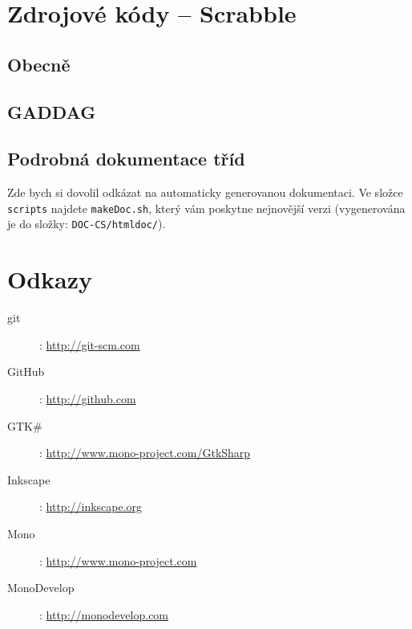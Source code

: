 \documentclass[a4paper]{article}
\begin{document}
\section{Zdrojové kódy -- Scrabble}\label{scrabble}
\subsection{Obecně}
\subsection{GADDAG}
\subsection{Podrobná dokumentace tříd}
Zde bych si dovolil odkázat na automaticky generovanou dokumentaci. Ve složce \texttt{scripts} najdete \texttt{makeDoc.sh}, který vám poskytne nejnovější verzi (vygenerována je do složky: \texttt{DOC-CS/htmldoc/}). 

\section{Odkazy}
\begin{description}
\item[git]: \href{http://git-scm.com}{http://git-scm.com}
\item[GitHub]: \href{http://github.com}{http://github.com}
\item[GTK\#]: \href{http://www.mono-project.com/GtkSharp}{http://www.mono-project.com/GtkSharp}
\item[Inkscape]: \href{http://inkscape.org}{http://inkscape.org}
\item[Mono]: \href{http://www.mono-project.com}{http://www.mono-project.com}
\item[MonoDevelop]: \href{http://monodevelop.com}{http://monodevelop.com}
\end{description}
\end{document}
